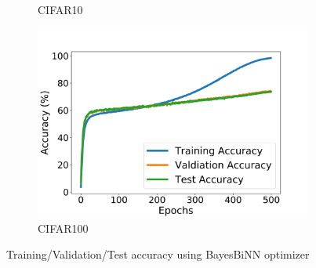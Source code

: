 \begin{figure}[h]
\begin{subfigure}[b]{0.3\textwidth}
         \caption{CIFAR10}
     \end{subfigure}
     \hfill
     \begin{subfigure}[b]{0.3\textwidth}
         \centering
         \includegraphics[width=1.2\textwidth]{../openreview/figs/CIFAR100.png}
         \caption{CIFAR100}
     \end{subfigure}
        \caption{Training/Validation/Test accuracy using BayesBiNN optimizer}
\end{figure}


